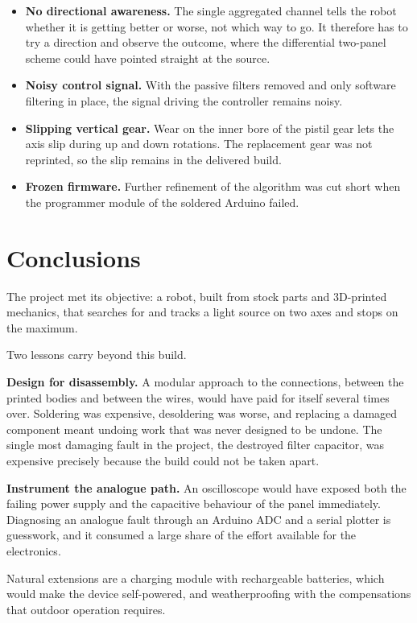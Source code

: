 \documentclass[10pt, conference, letterpaper]{IEEEtran}
\begin{document}
\begin{itemize}
  \item \textbf{No directional awareness.} The single aggregated channel tells the robot whether it is getting better or worse, not which way to go. It therefore has to try a direction and observe the outcome, where the differential two-panel scheme could have pointed straight at the source.
  \item \textbf{Noisy control signal.} With the passive filters removed and only software filtering in place, the signal driving the controller remains noisy.
  \item \textbf{Slipping vertical gear.} Wear on the inner bore of the pistil gear lets the axis slip during up and down rotations. The replacement gear was not reprinted, so the slip remains in the delivered build.
  \item \textbf{Frozen firmware.} Further refinement of the algorithm was cut short when the programmer module of the soldered Arduino failed.
\end{itemize}

\section{Conclusions}
\label{sec:concl}

The project met its objective: a robot, built from stock parts and 3D-printed mechanics, that searches for and tracks a light source on two axes and stops on the maximum.

Two lessons carry beyond this build.

\textbf{Design for disassembly.} A modular approach to the connections, between the printed bodies and between the wires, would have paid for itself several times over. Soldering was expensive, desoldering was worse, and replacing a damaged component meant undoing work that was never designed to be undone. The single most damaging fault in the project, the destroyed filter capacitor, was expensive precisely because the build could not be taken apart.

\textbf{Instrument the analogue path.} An oscilloscope would have exposed both the failing power supply and the capacitive behaviour of the panel immediately. Diagnosing an analogue fault through an Arduino ADC and a serial plotter is guesswork, and it consumed a large share of the effort available for the electronics.

Natural extensions are a charging module with rechargeable batteries, which would make the device self-powered, and weatherproofing with the compensations that outdoor operation requires.
\end{document}
